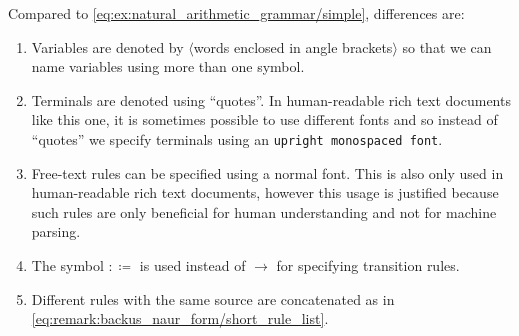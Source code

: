 \begin{example}
  Compared to \eqref{eq:ex:natural_arithmetic_grammar/simple}, differences are:
  \begin{enumerate}
    \item Variables are denoted by \( \langle \)words enclosed in angle brackets\( \rangle \) so that we can name variables using more than one symbol.
    \item Terminals are denoted using \enquote{quotes}. In human-readable rich text documents like this one, it is sometimes possible to use different fonts and so instead of \enquote{quotes} we specify terminals using an \texttt{upright monospaced font}.
    \item Free-text rules can be specified using a normal font. This is also only used in human-readable rich text documents, however this usage is justified because such rules are only beneficial for human understanding and not for machine parsing.
    \item The symbol \( :\coloneqq \) is used instead of \( \to \) for specifying transition rules.
    \item Different rules with the same source are concatenated as in \eqref{eq:remark:backus_naur_form/short_rule_list}.
  \end{enumerate}
\end{example}

